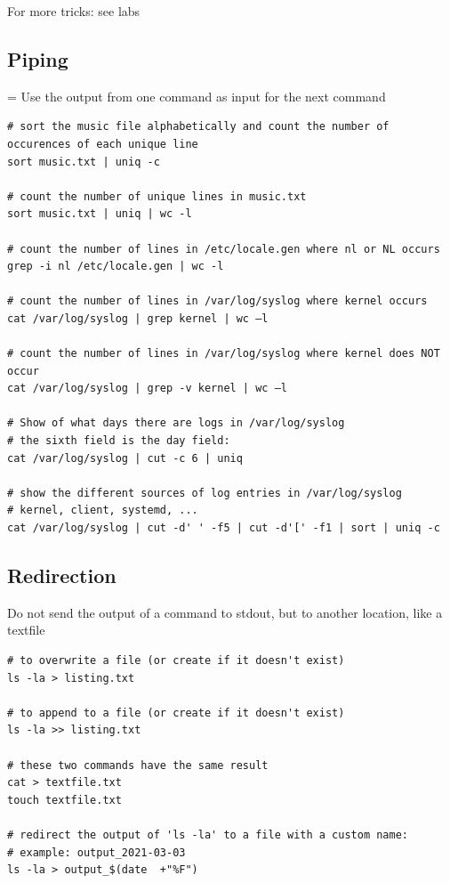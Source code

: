 \documentclass{article}
\begin{document}
For more tricks: see labs

\subsection{Piping}

= Use the output from one command as input for the next command

\begin{verbatim}
# sort the music file alphabetically and count the number of occurences of each unique line
sort music.txt | uniq -c

# count the number of unique lines in music.txt
sort music.txt | uniq | wc -l

# count the number of lines in /etc/locale.gen where nl or NL occurs
grep -i nl /etc/locale.gen | wc -l

# count the number of lines in /var/log/syslog where kernel occurs
cat /var/log/syslog | grep kernel | wc –l

# count the number of lines in /var/log/syslog where kernel does NOT occur
cat /var/log/syslog | grep -v kernel | wc –l

# Show of what days there are logs in /var/log/syslog
# the sixth field is the day field:
cat /var/log/syslog | cut -c 6 | uniq

# show the different sources of log entries in /var/log/syslog
# kernel, client, systemd, ...
cat /var/log/syslog | cut -d' ' -f5 | cut -d'[' -f1 | sort | uniq -c
\end{verbatim}

\subsection{Redirection}

Do not send the output of a command to stdout, but to another location, like a textfile

\begin{verbatim}
# to overwrite a file (or create if it doesn't exist)
ls -la > listing.txt

# to append to a file (or create if it doesn't exist)
ls -la >> listing.txt

# these two commands have the same result
cat > textfile.txt
touch textfile.txt

# redirect the output of 'ls -la' to a file with a custom name:
# example: output_2021-03-03
ls -la > output_$(date  +"%F")
\end{verbatim}
\end{document}
